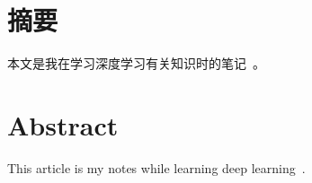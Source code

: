 \intobmk\chapter*{摘\quad 要}%
\setcounter{page}{1}%

本文是我在学习深度学习有关知识时的笔记~。

\intobmk\chapter*{Abstract}%

This article is my notes while learning deep learning~.

